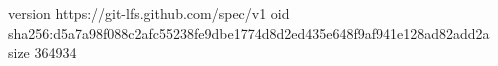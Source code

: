 version https://git-lfs.github.com/spec/v1
oid sha256:d5a7a98f088c2afc55238fe9dbe1774d8d2ed435e648f9af941e128ad82add2a
size 364934
